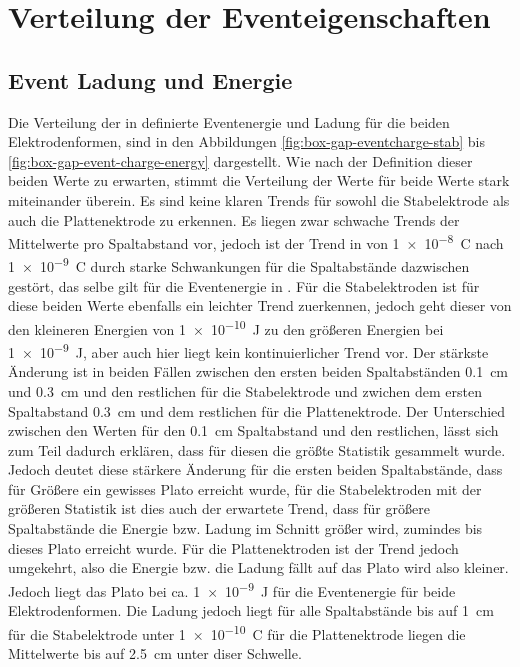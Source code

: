 \section{Verteilung der Eventeigenschaften}
\label{sec:event_value_distribution}

\subsection{Event Ladung und Energie}
\label{sec:event_charge_energie}
Die Verteilung der in  definierte Eventenergie und Ladung für die beiden Elektrodenformen, sind in den Abbildungen \ref{fig:box-gap-eventcharge-stab} bis \ref{fig:box-gap-event-charge-energy} dargestellt. Wie nach der Definition dieser beiden Werte zu erwarten, stimmt die Verteilung der Werte für beide Werte stark miteinander überein. Es sind keine klaren Trends für sowohl die Stabelektrode als auch die Plattenektrode zu erkennen. Es liegen zwar schwache Trends der Mittelwerte pro Spaltabstand vor, jedoch ist der Trend in  von \SI{1e-8}{\coulomb} nach \SI{1e-9}{\coulomb} durch starke Schwankungen für die Spaltabstände dazwischen gestört, das selbe gilt für die Eventenergie in . Für die Stabelektroden ist für diese beiden Werte ebenfalls ein leichter Trend zuerkennen, jedoch geht dieser von den kleineren Energien von \SI{1e-10}{\joule} zu den größeren Energien bei \SI{1e-9}{\joule}, aber auch hier liegt kein kontinuierlicher Trend vor. Der stärkste Änderung ist in beiden Fällen zwischen den ersten beiden Spaltabständen \SI{0.1}{\centi\meter} und \SI{0.3}{\centi\meter} und den restlichen für die Stabelektrode und zwichen dem ersten Spaltabstand \SI{0.3}{\centi\meter} und dem restlichen für die Plattenektrode. Der Unterschied zwischen den Werten für den \SI{0.1}{\centi\meter} Spaltabstand und den restlichen, lässt sich zum Teil dadurch erklären, dass für diesen die größte Statistik gesammelt wurde. Jedoch deutet diese stärkere Änderung für die ersten beiden Spaltabstände, dass für Größere ein gewisses Plato erreicht wurde, für die Stabelektroden mit der größeren Statistik ist dies auch der erwartete Trend, dass für größere Spaltabstände die Energie bzw. Ladung im Schnitt größer wird, zumindes bis dieses Plato erreicht wurde. Für die Plattenektroden ist der Trend jedoch umgekehrt, also die Energie bzw. die Ladung fällt auf das Plato wird also kleiner. Jedoch liegt das Plato bei ca. \SI{1e-9}{\joule} für die Eventenergie für beide Elektrodenformen. Die Ladung jedoch liegt für alle Spaltabstände bis auf \SI{1}{\centi\meter} für die Stabelektrode unter \SI{1e-10}{\coulomb} für die Plattenektrode liegen die Mittelwerte bis auf \SI{2.5}{\centi\meter} unter diser Schwelle.

